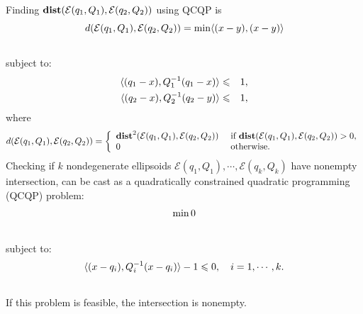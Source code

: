 \documentclass[letterpaper,10pt,english]{sphinxmanual}
\begin{document}
Finding ${\bf dist}({\mathcal E}(q_1,Q_1),{\mathcal E}(q_2,Q_2))$
using QCQP is
\begin{gather}
\begin{split}d({\mathcal E}(q_1,Q_1),{\mathcal E}(q_2,Q_2)) = \min \langle (x-y), (x-y)\rangle\end{split}\notag\\\begin{split}\end{split}\notag
\end{gather}
subject to:
\begin{gather}
\begin{split}\begin{aligned}
\langle (q_1-x), Q_1^{-1}(q_1-x)\rangle & \leqslant& 1,\\
\langle (q_2-x), Q_2^{-1}(q_2-y)\rangle & \leqslant& 1,\end{aligned}\end{split}\notag
\end{gather}
where
\begin{gather}
\begin{split}d({\mathcal E}(q_1,Q_1),{\mathcal E}(q_2,Q_2))=\left\{\begin{array}{ll}
{\bf dist}^2({\mathcal E}(q_1,Q_1),{\mathcal E}(q_2,Q_2)) &
\mbox{ if } {\bf dist}({\mathcal E}(q_1,Q_1),{\mathcal E}(q_2,Q_2))>0, \\
0 & \mbox{ otherwise}. \end{array}\right.\end{split}\notag
\end{gather}
Checking if $k$ nondegenerate ellipsoids
${\mathcal E}(q_1,Q_1),\cdots,{\mathcal E}(q_k,Q_k)$ have nonempty
intersection, can be cast as a quadratically constrained quadratic
programming (QCQP) problem:
\begin{gather}
\begin{split}\min 0\end{split}\notag\\\begin{split}\end{split}\notag
\end{gather}
subject to:
\begin{gather}
\begin{split}\langle (x-q_i),Q_i^{-1}(x-q_i)\rangle - 1 \leqslant0, ~~~ i=1,\cdots,k.\end{split}\notag\\\begin{split}\end{split}\notag
\end{gather}
If this problem is feasible, the intersection is nonempty.
\end{document}
